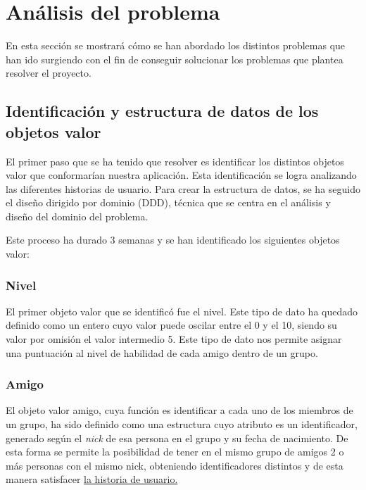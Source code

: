 \chapter{Análisis del problema}
 
En esta sección se mostrará cómo se han abordado los distintos problemas que han ido surgiendo con el fin de conseguir solucionar los problemas que plantea resolver 
el proyecto.

\section{Identificación y estructura de datos de los objetos valor}

El primer paso que se ha tenido que resolver es identificar los distintos objetos valor que conformarían nuestra aplicación. Esta identificación se logra analizando las diferentes historias de usuario.
Para crear la estructura de datos, se ha seguido el diseño dirigido por dominio (DDD), técnica que se centra en el análisis y diseño del dominio del problema.

Este proceso ha durado 3 semanas y se han identificado los siguientes objetos valor:

\subsection{Nivel}

El primer objeto valor que se identificó fue el nivel.
Este tipo de dato ha quedado definido como un entero cuyo valor puede oscilar entre el 0 y el 10, siendo su valor por omisión el valor intermedio 5.
Este tipo de dato nos permite asignar una puntuación al nivel de habilidad de cada amigo dentro de un grupo.

\subsection{Amigo}

El objeto valor amigo, cuya función es identificar a cada uno de los miembros de un grupo, ha sido definido como una estructura cuyo atributo es un identificador, generado según el \textit{nick}
 de esa persona en el grupo y su fecha de nacimiento. De esta forma se permite la posibilidad de tener en el mismo grupo de amigos 2 o más personas con el mismo nick, obteniendo identificadores distintos
 y de esta manera satisfacer \href{https://github.com/manujurado1/SportsBar-IV/issues/119}{la historia de usuario.}



